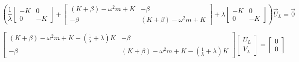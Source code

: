\documentclass[12pt,a4paper]{article}
\begin{document}
\begin{sol}
\begin{enumerate}
\begin{minipage}[t]{18.5cm}
				\[
				\left(\frac1\lambda \left[\begin{matrix}
					-K & 0 \\
					0 & -K
				\end{matrix}\right]+\left[\begin{matrix}
					(K+\beta)-\omega^2 m + K & -\beta\\
					-\beta & (K+\beta)-\omega^2m+K
				\end{matrix}\right] + \lambda\left[\begin{matrix}
					-K & 0\\
					0 & -K
				\end{matrix}\right]\right)\vec U_L = \vec{0}
				\]
				
				\[
				\left[\begin{matrix}
					(K+\beta)-\omega^2m+K-(\frac1\lambda+\lambda)K & - \beta \\
					-\beta & (K+\beta)-\omega^2m + K-(\frac1\lambda + \lambda)K
				\end{matrix}\right]\left[\begin{matrix}
					U_L \\
					V_L
				\end{matrix}\right] = \left[\begin{matrix}
					0 \\ 0
				\end{matrix}\right]
				\]
			\end{minipage}	
		\end{enumerate}
	\end{sol}
	
\end{document}
